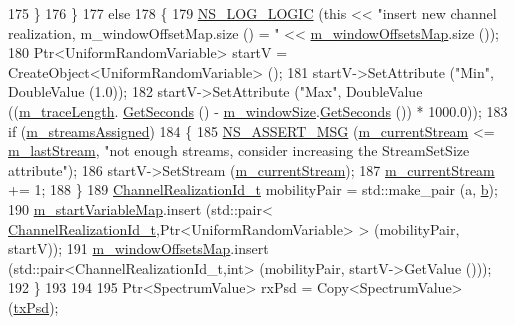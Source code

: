 \begin{DoxyCode}
175         \}
176     \}
177   \textcolor{keywordflow}{else}
178     \{
179       \hyperlink{group__logging_ga88acd260151caf2db9c0fc84997f45ce}{NS\_LOG\_LOGIC} (\textcolor{keyword}{this} << \textcolor{stringliteral}{"insert new channel realization, m\_windowOffsetMap.size () = "} << 
      \hyperlink{classns3_1_1TraceFadingLossModel_aba701b6e63395fd422f72cd3cd08564a}{m\_windowOffsetsMap}.size ());
180       Ptr<UniformRandomVariable> startV = CreateObject<UniformRandomVariable> ();
181       startV->SetAttribute (\textcolor{stringliteral}{"Min"}, DoubleValue (1.0));
182       startV->SetAttribute (\textcolor{stringliteral}{"Max"}, DoubleValue ((\hyperlink{classns3_1_1TraceFadingLossModel_a0f900aa679db8209d997e5253e3e16e4}{m\_traceLength}.
      \hyperlink{classns3_1_1Time_a8f20d5c3b0902d7b4320982f340b57c8}{GetSeconds} () - \hyperlink{classns3_1_1TraceFadingLossModel_ad872ee7d3fec738e41519fa6562c48fb}{m\_windowSize}.\hyperlink{classns3_1_1Time_a8f20d5c3b0902d7b4320982f340b57c8}{GetSeconds} ()) * 1000.0));
183       \textcolor{keywordflow}{if} (\hyperlink{classns3_1_1TraceFadingLossModel_a9f490e1d8426c9661d0bd6acdab01104}{m\_streamsAssigned})
184         \{
185           \hyperlink{assert_8h_aff5ece9066c74e681e74999856f08539}{NS\_ASSERT\_MSG} (\hyperlink{classns3_1_1TraceFadingLossModel_acbbf4b0443de173db3bd48e90581adde}{m\_currentStream} <= 
      \hyperlink{classns3_1_1TraceFadingLossModel_ad88d7e169a734f6b638d1ebf60f4b6fb}{m\_lastStream}, \textcolor{stringliteral}{"not enough streams, consider increasing the StreamSetSize attribute"});
186           startV->SetStream (\hyperlink{classns3_1_1TraceFadingLossModel_acbbf4b0443de173db3bd48e90581adde}{m\_currentStream});
187           \hyperlink{classns3_1_1TraceFadingLossModel_acbbf4b0443de173db3bd48e90581adde}{m\_currentStream} += 1;
188         \}
189       \hyperlink{classns3_1_1TraceFadingLossModel_a538fb5e148b837e46a2da767346839d4}{ChannelRealizationId\_t} mobilityPair = std::make\_pair (a,
      \hyperlink{buildings__pathloss_8m_a21ad0bd836b90d08f4cf640b4c298e7c}{b});
190       \hyperlink{classns3_1_1TraceFadingLossModel_a7e4e1717c089e89cb5de897687033354}{m\_startVariableMap}.insert (std::pair<
      \hyperlink{classns3_1_1TraceFadingLossModel_a538fb5e148b837e46a2da767346839d4}{ChannelRealizationId\_t},Ptr<UniformRandomVariable> > (mobilityPair, startV));
191       \hyperlink{classns3_1_1TraceFadingLossModel_aba701b6e63395fd422f72cd3cd08564a}{m\_windowOffsetsMap}.insert (std::pair<ChannelRealizationId\_t,int> (mobilityPair, 
      startV->GetValue ()));
192     \}
193 
194   
195   Ptr<SpectrumValue> rxPsd = Copy<SpectrumValue> (\hyperlink{lte__link__budget_8m_a684fe3101a5e48a5fcc57cab8dbcd1aa}{txPsd});

\end{DoxyCode}
